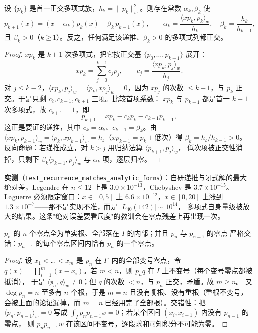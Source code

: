 \begin{theorem}[三项递推]
\label{thm:recurrence}
设 $\{p_k\}$ 是首一正交多项式族，$h_k=\|p_k\|_w^2$。则存在常数 $\alpha_k,\beta_k$ 使
\[
  p_{k+1}(x)=(x-\alpha_k)p_k(x)-\beta_k\,p_{k-1}(x),\qquad
  \alpha_k=\frac{\langle xp_k,p_k\rangle_w}{h_k},\quad
  \beta_k=\frac{h_k}{h_{k-1}},
\]
且 $\beta_k>0$（$k\ge1$）。反之，任何满足该递推、$\beta_k>0$ 的多项式列都正交。
\end{theorem}

\begin{proof}
$x p_k$ 是 $k+1$ 次多项式，把它按正交基 $\{p_0,\dots,p_{k+1}\}$ 展开：
\[
  x p_k=\sum_{j=0}^{k+1} c_j p_j,\qquad
  c_j=\frac{\langle xp_k,p_j\rangle_w}{h_j}.
\]
对 $j\le k-2$，$\langle xp_k,p_j\rangle_w=\langle p_k,xp_j\rangle_w=0$，因为 $xp_j$ 的次数
$\le k-1$，与 $p_k$ 正交。于是只剩 $c_k,c_{k-1},c_{k+1}$ 三项。比较首项系数：
$xp_k$ 与 $p_{k+1}$ 都是首一 $k+1$ 次多项式，故 $c_{k+1}=1$，即
\[
  p_{k+1}=xp_k-c_kp_k-c_{k-1}p_{k-1},
\]
这正是要证的递推，其中 $c_k=\alpha_k$、$c_{k-1}=\beta_k$。由 $\langle xp_k,p_{k-1}\rangle_w
=\langle p_k,xp_{k-1}\rangle_w=h_k$（$xp_{k-1}=p_k+\text{低次}$）得 $\beta_k=h_k/h_{k-1}>0$。
反向命题：若递推成立，对 $k>j$ 用归纳法算 $\langle p_{k+1},p_j\rangle_w$，
低次项被正交性消掉，只剩下 $\beta_k\langle p_{k-1},p_j\rangle_w$ 与
$\alpha_k$ 项，逐层归零。
\end{proof}

\textbf{实测}（\texttt{test\_recurrence\_matches\_analytic\_forms}）：自研递推与闭式解的最大
绝对差，Legendre 在 $n\le12$ 上是 $3.0\times10^{-13}$，Chebyshev 是 $3.7\times10^{-15}$。
Laguerre 必须限定窗口：$x\in[0,5]$ 上 $6.6\times10^{-12}$，$x\in[0,20]$ 上涨到
$1.3\times10^{-7}$——那不是实现不准，而是 $|L_{40}(142)|\sim10^{14}$，
多项式自身量级被放大的结果。这条"绝对误差要看尺度"的教训会在零点残差上再出现一次。

\begin{corollary}[零点的位置与交错]
\label{cor:zeros}
$p_n$ 的 $n$ 个零点全为单实根、全部落在 $I$ 的内部；并且 $p_n$ 与 $p_{n-1}$ 的零点
严格交错：$p_{n-1}$ 的每个零点区间内恰有 $p_n$ 的一个零点。
\end{corollary}

\begin{proof}
设 $x_1<\dots<x_m$ 是 $p_n$ 在 $I^\circ$ 内的全部变号零点，令
$q(x)=\prod_{i=1}^m(x-x_i)$。若 $m<n$，则 $p_nq$ 在 $I$ 上不变号（每个变号零点都被抵消），
于是 $\langle p_n,q\rangle_w\ne0$；但 $q$ 的次数 $<n$，与 $p_n$ 正交，矛盾。故 $m\ge n$。
又 $\deg p_n=n$ 至多有 $n$ 个根，于是 $m=n$ 且没有复根、没有重根（重根不变号，
会被上面的论证漏掉，而 $m=n$ 已经用完了全部根）。交错性：把 $\langle p_n,p_{n-1}\rangle_w=0$
写成 $\int_I p_np_{n-1}w=0$；若某个区间 $(x_i,x_{i+1})$ 内没有 $p_{n-1}$ 的零点，
则 $p_np_{n-1}w$ 在该区间不变号，逐段求和可知积分不可能为零。
\end{proof}

